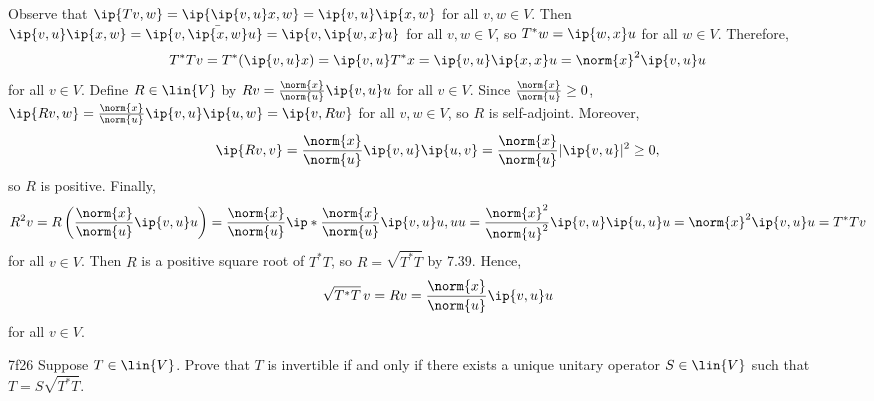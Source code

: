 \begin{sol}
    Observe that $\ip{Tv, w} = \ip{\ip{v, u}x, w} = \ip{v, u} \ip{x, w}$ for all $v, w \in V$.
    Then $\ip{v, u} \ip{x, w} = \ip{v, \bar{\ip{x, w}} u} = \ip{v, \ip{w, x} u}$ for all $v, w \in V$, so $T^\ast w = \ip{w, x} u$ for all $w \in V$.
    Therefore,
    \[
        T^\ast T v = T^\ast (\ip{v, u} x) = \ip{v, u} T^\ast x = \ip{v, u} \ip{x, x} u = \norm{x}^2 \ip{v, u} u
    \]
    for all $v \in V$.
    Define $R \in \lin{V}$ by $Rv = \frac{\norm{x}}{\norm{u}} \ip{v, u} u$ for all $v \in V$.
    Since $\frac{\norm{x}}{\norm{u}} \geq 0$, $\ip{Rv, w} = \frac{\norm{x}}{\norm{u}} \ip{v, u} \ip{u, w} = \ip{v, Rw}$ for all $v, w \in V$, so $R$ is self-adjoint.
    Moreover,
    \[
        \ip{Rv, v} = \frac{\norm{x}}{\norm{u}} \ip{v, u} \ip{u, v} = \frac{\norm{x}}{\norm{u}} |\ip{v, u}|^2 \geq 0,
    \]
    so $R$ is positive.
    Finally,
    \[
        R^2 v = R\left(\frac{\norm{x}}{\norm{u}} \ip{v, u} u\right) = \frac{\norm{x}}{\norm{u}} \ip*{\frac{\norm{x}}{\norm{u}} \ip{v, u} u, u} u = \frac{\norm{x}^2}{\norm{u}^2} \ip{v, u} \ip{u, u} u = \norm{x}^2 \ip{v, u} u = T^\ast T v
    \]
    for all $v \in V$.
    Then $R$ is a positive square root of $T^\ast T$, so $R = \sqrt{T^\ast T}$ by 7.39.
    Hence,
    \[
        \sqrt{T^\ast T}\,v = Rv = \frac{\norm{x}}{\norm{u}} \ip{v, u} u
    \]
    for all $v \in V$.
\end{sol}

\begin{exercise}{7f26}
    Suppose $T \in \lin{V}$.
    Prove that $T$ is invertible if and only if there exists a unique unitary operator $S \in \lin{V}$ such that $T = S\sqrt{T^\ast T}$.
\end{exercise}


